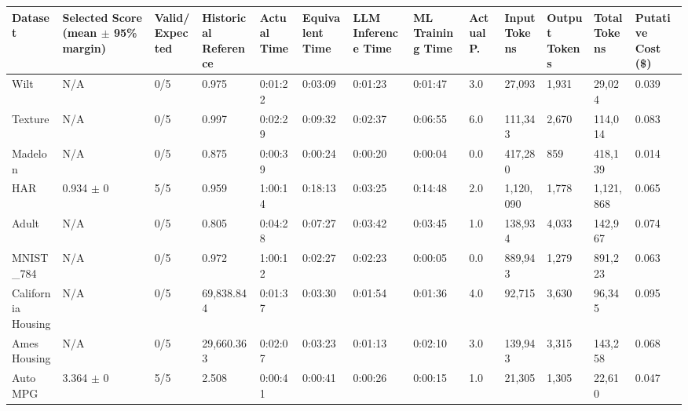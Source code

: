 \begin{tabular}{lllllllllllll}
\hline
Dataset & Selected Score (mean \ensuremath{\pm} 95\% margin) & Valid/Expected & Historical Reference & Actual Time & Equivalent Time & LLM Inference Time & ML Training Time & Actual P. & Input Tokens & Output Tokens & Total Tokens & Putative Cost (\$) \\
\hline
Wilt & N/A & 0/5 & 0.975 & 0:01:22 & 0:03:09 & 0:01:23 & 0:01:47 & 3.0 & 27,093 & 1,931 & 29,024 & 0.039 \\
Texture & N/A & 0/5 & 0.997 & 0:02:29 & 0:09:32 & 0:02:37 & 0:06:55 & 6.0 & 111,343 & 2,670 & 114,014 & 0.083 \\
Madelon & N/A & 0/5 & 0.875 & 0:00:39 & 0:00:24 & 0:00:20 & 0:00:04 & 0.0 & 417,280 & 859 & 418,139 & 0.014 \\
HAR & 0.934 \ensuremath{\pm} 0 & 5/5 & 0.959 & 1:00:14 & 0:18:13 & 0:03:25 & 0:14:48 & 2.0 & 1,120,090 & 1,778 & 1,121,868 & 0.065 \\
Adult & N/A & 0/5 & 0.805 & 0:04:28 & 0:07:27 & 0:03:42 & 0:03:45 & 1.0 & 138,934 & 4,033 & 142,967 & 0.074 \\
MNIST\_784 & N/A & 0/5 & 0.972 & 1:00:12 & 0:02:27 & 0:02:23 & 0:00:05 & 0.0 & 889,943 & 1,279 & 891,223 & 0.063 \\
California Housing & N/A & 0/5 & 69,838.844 & 0:01:37 & 0:03:30 & 0:01:54 & 0:01:36 & 4.0 & 92,715 & 3,630 & 96,345 & 0.095 \\
Ames Housing & N/A & 0/5 & 29,660.363 & 0:02:07 & 0:03:23 & 0:01:13 & 0:02:10 & 3.0 & 139,943 & 3,315 & 143,258 & 0.068 \\
Auto MPG & 3.364 \ensuremath{\pm} 0 & 5/5 & 2.508 & 0:00:41 & 0:00:41 & 0:00:26 & 0:00:15 & 1.0 & 21,305 & 1,305 & 22,610 & 0.047 \\
\hline
\end{tabular}
